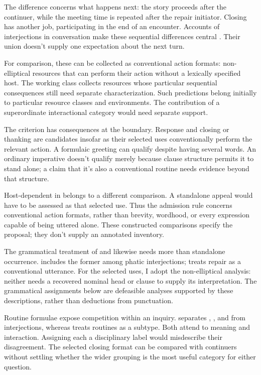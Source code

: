 \documentclass[12pt]{article}
\begin{document}
The difference concerns what happens next: the story proceeds after
the continuer, while the meeting time is repeated after the repair
initiator. Closing  has another job, participating in the
end of an encounter. Accounts of interjections in conversation make
these sequential differences central \citep[257--259, 263--265]{dingemanse2024}.
Their union doesn't supply one expectation about the next turn.

For comparison, these can be collected as conventional action formats:
non-elliptical resources that can perform their action without a lexically
specified host. The working class collects resources whose particular sequential
consequences still need separate characterization. Such predictions belong initially to
particular resource classes and environments. The contribution of a
superordinate interactional category would need separate support.

The criterion has consequences at the boundary. Response 
and closing or thanking  are candidates insofar as their
selected uses conventionally perform the relevant action. A formulaic
greeting  can qualify despite having several words.
An ordinary imperative  doesn't qualify merely because
clause structure permits it to stand alone; a claim that it's also a
conventional routine needs evidence beyond that structure.

Host-dependent  in  belongs to
a different comparison. A standalone appeal  would have
to be assessed as that selected use. Thus the admission rule concerns
conventional action formats, rather than brevity, wordhood, or every
expression capable of being uttered alone. These constructed comparisons
specify the proposal; they don't supply an annotated inventory.

The grammatical treatment of  and  likewise
needs more than standalone occurrence. \textcite[114]{ameka1992} includes the former among
phatic interjections; \textcite[152]{wilkins1992} treats repair 
as a conventional utterance.
For the selected uses, I adopt the non-elliptical analysis: neither needs
a recovered nominal head or clause to supply its interpretation.
The grammatical assignments below are defeasible analyses supported by
these descriptions, rather than deductions from punctuation.

Routine formulae expose competition within an inquiry.
\textcite[108--110]{ameka1992} separates , ,
and  from interjections, whereas
\textcite[142]{wilkins1992} treats routines as a subtype. Both attend
to meaning and interaction. Assigning each a disciplinary label would
misdescribe their disagreement. The selected closing format can be
compared with continuers without settling whether the wider grouping
is the most useful category for either question.
\end{document}
